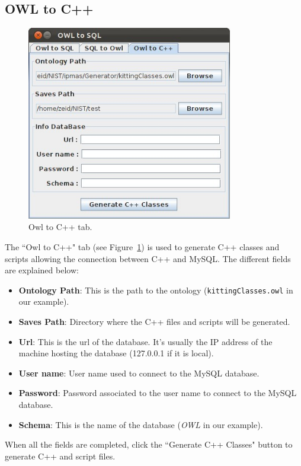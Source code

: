\documentclass[12pt]{article}
\begin{document}
\subsection{OWL to C++}
\begin{figure}[h!t!]
\centering
\includegraphics[width=9cm]{Figure/OWL2C++.jpeg}
\caption{Owl to C++ tab.}
\label{fig:owl2C++}
\end{figure}
The ``Owl to C++" tab (see Figure~\ref{fig:owl2C++}) is used to generate C++ classes and scripts allowing the connection between C++ and MySQL. The different fields are explained below:
\begin{itemize}
\item \textbf{Ontology Path}: This is the path to the ontology (\texttt{kittingClasses.owl} in our example). 
\item \textbf{Saves Path}: Directory where the C++ files and scripts will be generated.
\item \textbf{Url}: This is the url of the database. It's usually the IP address of the machine hosting the database (127.0.0.1 if it is local).
\item \textbf{User name}: User name used to connect to the MySQL database.
\item \textbf{Password}: Password associated to the user name to connect to the MySQL database.
\item \textbf{Schema}: This is the name of the database (\textit{OWL} in our example).
\end{itemize}

When all the fields are completed, click the ``Generate C++ Classes" button to generate C++ and script files.
\end{document}
